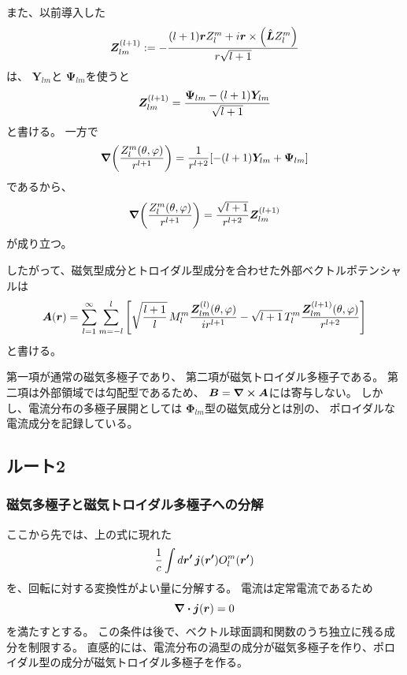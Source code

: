 \documentclass[../master.tex]{subfiles}
\begin{document}
また、以前導入した
\begin{equation}
    \vb*{Z}_{lm}^{(l+1)}
    :=
    -
    \frac{
    (l+1)\vb*{r}Z_l^m
    +
    i\vb*{r}\times
    \qty(\hat{\vb*{L}}Z_l^m)
    }{
    r\sqrt{l+1}
    }
\end{equation}
は、
\(\boldsymbol{Y}_{lm}\)と
\(\boldsymbol{\Psi}_{lm}\)を使うと
\begin{equation}
    \vb*{Z}_{lm}^{(l+1)}
    =
    \frac{
    \boldsymbol{\Psi}_{lm}
    -
    (l+1)\boldsymbol{Y}_{lm}
    }{\sqrt{l+1}}
\end{equation}
と書ける。
一方で
\begin{equation}
    \grad\qty(
    \frac{Z_l^m(\theta,\varphi)}{r^{l+1}}
    )
    =
    \frac{1}{r^{l+2}}
    \qty[
    -(l+1)\boldsymbol{Y}_{lm}
    +
    \boldsymbol{\Psi}_{lm}
    ]
\end{equation}
であるから、
\begin{equation}
    \grad\qty(
    \frac{Z_l^m(\theta,\varphi)}{r^{l+1}}
    )
    =
    \frac{\sqrt{l+1}}{r^{l+2}}
    \vb*{Z}_{lm}^{(l+1)}
\end{equation}
が成り立つ。

したがって、磁気型成分とトロイダル型成分を合わせた外部ベクトルポテンシャルは
\begin{equation}
    {
    \vb*{A}(\vb*{r})
    =
    \sum_{l=1}^{\infty}\sum_{m=-l}^{l}
    \qty[
    \sqrt{\frac{l+1}{l}}\,
    M_l^m
    \frac{\vb*{Z}_{lm}^{(l)}(\theta,\varphi)}
    {i r^{l+1}}
    -
    \sqrt{l+1}\,
    T_l^m
    \frac{\vb*{Z}_{lm}^{(l+1)}(\theta,\varphi)}
    {r^{l+2}}
    ]
    }
\end{equation}
と書ける。

第一項が通常の磁気多極子であり、
第二項が磁気トロイダル多極子である。
第二項は外部領域では勾配型であるため、
\(\vb*{B}=\curl\vb*{A}\)には寄与しない。
しかし、電流分布の多極子展開としては
\(\boldsymbol{\Phi}_{lm}\)型の磁気成分とは別の、
ポロイダルな電流成分を記録している。


\subsection{ルート2}
\subsubsection*{磁気多極子と磁気トロイダル多極子への分解}
ここから先では、上の式に現れた
\begin{equation}
    \frac{1}{c}\int d\vb*{r'}\,\vb*{j}(\vb*{r'})O_l^m(\vb*{r'})
\end{equation}
を、回転に対する変換性がよい量に分解する。
電流は定常電流であるため
\begin{equation}
    \div\vb*{j}(\vb*{r})=0
\end{equation}
を満たすとする。
この条件は後で、ベクトル球面調和関数のうち独立に残る成分を制限する。
直感的には、電流分布の渦型の成分が磁気多極子を作り、ポロイダル型の成分が磁気トロイダル多極子を作る。
\end{document}
